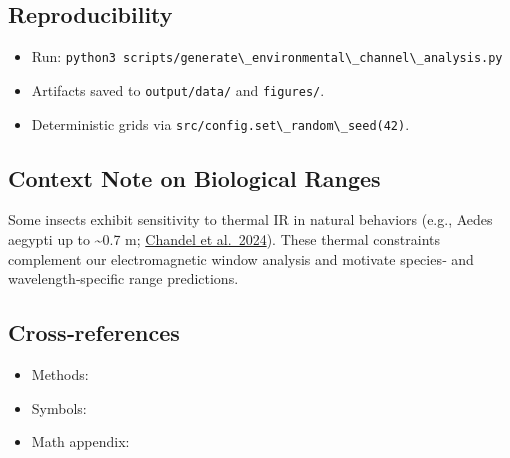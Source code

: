 \documentclass[
  13pt,
  a4paperpaper,
  12pt]{article}
\newcommand{\passthrough}[1]{#1}
\providecommand{\tightlist}{%
  \setlength{\itemsep}{0pt}\setlength{\parskip}{0pt}}
\begin{document}
\subsection{Reproducibility}\label{reproducibility}

\begin{itemize}
\tightlist
\item
  Run:
  \passthrough{\lstinline!python3 scripts/generate\_environmental\_channel\_analysis.py!}
\item
  Artifacts saved to \passthrough{\lstinline!output/data/!} and
  \passthrough{\lstinline!figures/!}.
\item
  Deterministic grids via
  \passthrough{\lstinline!src/config.set\_random\_seed(42)!}.
\end{itemize}

\subsection{Context Note on Biological
Ranges}\label{context-note-on-biological-ranges}

Some insects exhibit sensitivity to thermal IR in natural behaviors
(e.g., Aedes aegypti up to \textasciitilde0.7 m;
\href{https://www.nature.com/articles/s41586-024-07848-5}{Chandel et
al.~2024}). These thermal constraints complement our electromagnetic
window analysis and motivate species‑ and wavelength‑specific range
predictions.

\subsection{Cross‑references}\label{crossreferences}

\begin{itemize}
\tightlist
\item
  Methods: 
\item
  Symbols: 
\item
  Math appendix: 
\end{itemize}
\end{document}
